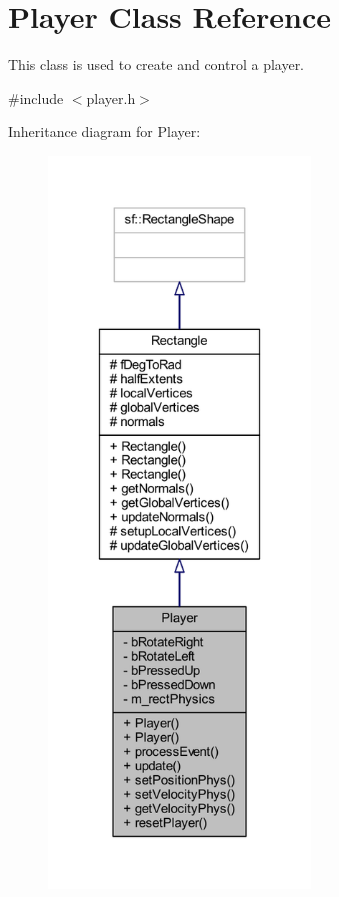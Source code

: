 \hypertarget{class_player}{}\section{Player Class Reference}
\label{class_player}


This class is used to create and control a player.  




{\ttfamily \#include $<$player.\+h$>$}



Inheritance diagram for Player\+:\nopagebreak
\begin{figure}[H]
\begin{center}
\leavevmode
\includegraphics[height=550pt]{class_player__inherit__graph}
\end{center}
\end{figure}


